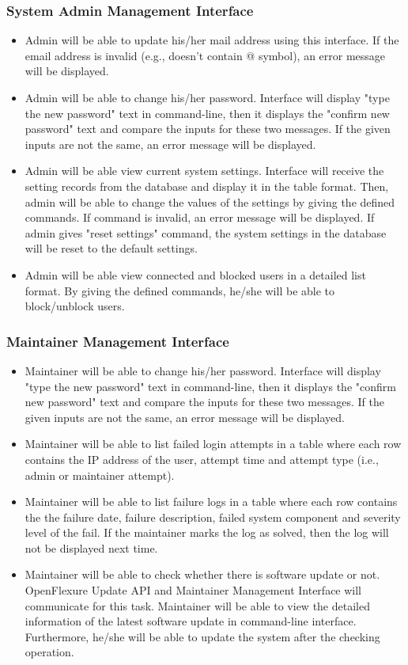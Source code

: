 \subsubsection{System Admin Management Interface}
\begin{itemize}
	\item Admin will be able to update his/her mail address using this interface. If the email address is invalid (e.g., doesn't contain @ symbol), an error message will be displayed.
	\item Admin will be able to change his/her password. Interface will display "type the new password" text in command-line, then it displays the "confirm new password" text and compare the inputs for these two messages. If the given inputs are not the same, an error message will be displayed.
	\item Admin will be able view current system settings. Interface will receive the setting records from the database and display it in the table format. Then, admin will be able to change the values of the settings by giving the defined commands. If command is invalid, an error message will be displayed. If admin gives "reset settings" command, the system settings in the database will be reset to the default settings.
	\item Admin will be able view connected and blocked users in a detailed list format. By giving the defined commands, he/she will be able to block/unblock users.
\end{itemize}

\subsubsection{Maintainer Management Interface}
\begin{itemize}
	\item Maintainer will be able to change his/her password. Interface will display "type the new password" text in command-line, then it displays the "confirm new password" text and compare the inputs for these two messages. If the given inputs are not the same, an error message will be displayed.
	\item Maintainer will be able to list failed login attempts in a table where each row contains the IP address of the user, attempt time and attempt type (i.e., admin or maintainer attempt).
	\item Maintainer will be able to list failure logs in a table where each row contains the the failure date, failure description, failed system component and severity level of the fail. If the maintainer marks the log as solved, then the log will not be displayed next time.
	\item Maintainer will be able to check whether there is software update or not. OpenFlexure Update API and Maintainer Management Interface will communicate for this task. Maintainer will be able to view the detailed information of the latest software update in command-line interface. Furthermore, he/she will be able to update the system after the checking operation.
\end{itemize}
